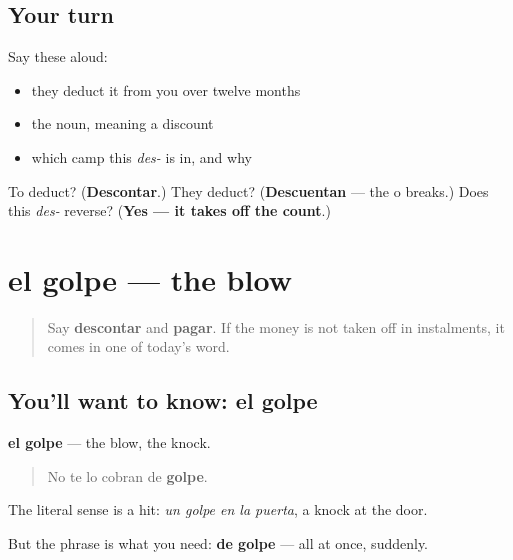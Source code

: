 \subsection*{Your turn}
Say these aloud:

\begin{itemize}
\raggedright
  \item they deduct it from you over twelve months
  \item the noun, meaning a discount
  \item which camp this \emph{des-} is in, and why
\end{itemize}

\begin{tcolorbox}[breakable,colback=teal!4,colframe=teal!35!black,title={Before you move on}]
To deduct? (\textbf{Descontar}.) They deduct? (\textbf{Descuentan} — the o breaks.) Does this \emph{des-} reverse? (\textbf{Yes — it takes off the count}.)
\end{tcolorbox}
\section[el golpe]{el golpe — the blow}

\label{lesson:ES-C474-golpe}



\begin{quote}
Say \textbf{descontar} and \textbf{pagar}. If the money is not taken off in instalments, it comes in one of today's word.
\end{quote}

\subsection*{You'll want to know: el golpe}
\textbf{el golpe} — the blow, the knock.

\begin{quote}
No te lo cobran de \textbf{golpe}.
\end{quote}

The literal sense is a hit: \emph{un golpe en la puerta}, a knock at the door.

But the phrase is what you need: \textbf{de golpe} — all at once, suddenly.

